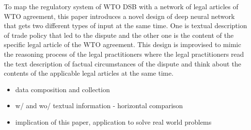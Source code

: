To map the regulatory system of WTO DSB with a network of legal articles of WTO agreement,
this paper introduces a novel design of deep neural network \citep{DBLP:journals/corr/Schmidhuber14} that
gets two different types of input at the same time.
One is textual description of trade policy that led to the dispute and
the other one is the content of the specific legal article of the WTO agreement.
This design is improvised to mimic
the reasoning process of the legal practitioners
where the legal practitioners read
the text description of
factual circumstances of the dispute and think about the contents of
the applicable legal articles at the same time.

\begin{itemize}
    \item data composition and collection
    \item w/ and wo/ textual information - horizontal comparison
    \item implication of this paper, application to solve real world problems
\end{itemize}


 

 
